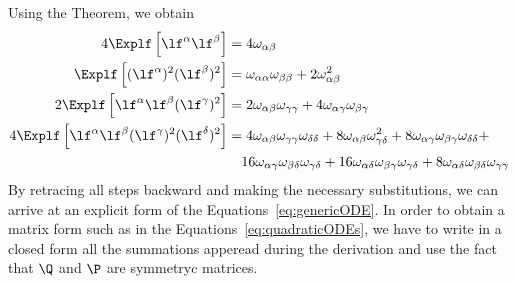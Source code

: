 Using the Theorem, we obtain
\begin{align*}
  4 \Explf  \left[\lf^\alpha \lf^\beta \right] &= 4\omega_{\alpha\beta}\\
  \Explf  \left[(\lf^\alpha)^2 (\lf^\beta)^2 \right] 
  &= \omega_{\alpha\alpha}  \omega_{\beta\beta} + 2 \omega_{\alpha\beta}^2 \\
  2\Explf  \left[\lf^\alpha \lf^\beta (\lf^\gamma)^2\right] 
  &= 2 \omega_{\alpha\beta}\omega_{\gamma\gamma} + 4 \omega_{\alpha\gamma}\omega_{\beta\gamma}\\
  4\Explf  \left[\lf^\alpha \lf^\beta (\lf^\gamma)^2 (\lf^\delta)^2\right] 
  &= 4\omega_{\alpha\beta}\omega_{\gamma\gamma}\omega_{\delta\delta} + 8\omega_{\alpha\beta}\omega_{\gamma\delta}^2 + 8\omega_{\alpha\gamma}\omega_{\beta\gamma}\omega_{\delta\delta} +\\
  &\quad16\omega_{\alpha\gamma}\omega_{\beta\delta}\omega_{\gamma\delta}+16\omega_{\alpha\delta}\omega_{\beta\gamma}\omega_{\gamma\delta} + 8\omega_{\alpha\delta}\omega_{\beta\delta}\omega_{\gamma\gamma}
\end{align*}
By retracing all steps backward and making the necessary substitutions,
we can arrive at an explicit form of the Equations~\eqref{eq:genericODE}. In order
to obtain a matrix form such as in the Equations~\eqref{eq:quadraticODEs}, 
we have to write in a closed form all the summations apperead during the derivation
and use the fact that \(\Q\) and \(\P\) are symmetryc matrices.